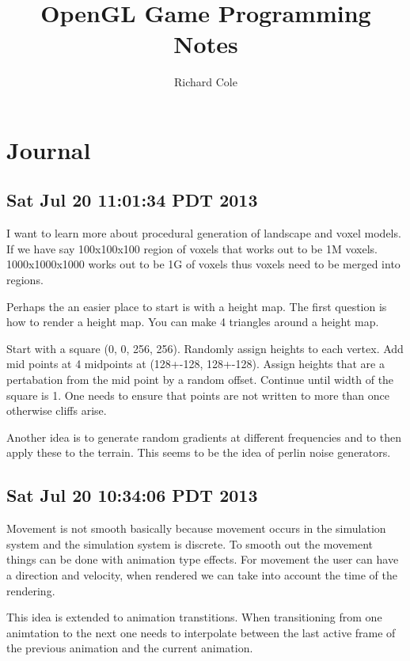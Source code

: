 \documentclass[12pt]{article}
\title{OpenGL Game Programming Notes}
\author{Richard Cole}
\date{}
\begin{document}
\maketitle

\section{Journal}

\subsection{Sat Jul 20 11:01:34 PDT 2013}

I want to learn more about procedural generation of landscape and
voxel models. If we have say 100x100x100 region of voxels that works
out to be 1M voxels. 1000x1000x1000 works out to be 1G of voxels thus
voxels need to be merged into regions.

Perhaps the an easier place to start is with a height map. The first
question is how to render a height map. You can make 4 triangles
around a height map.

Start with a square (0, 0, 256, 256). Randomly assign heights to each
vertex. Add mid points at 4 midpoints at (128+-128, 128+-128). Assign
heights that are a pertabation from the mid point by a random
offset. Continue until width of the square is 1. One needs to ensure
that points are not written to more than once otherwise cliffs arise.

Another idea is to generate random gradients at different frequencies
and to then apply these to the terrain. This seems to be the idea of
perlin noise generators.





\subsection{Sat Jul 20 10:34:06 PDT 2013}

Movement is not smooth basically because movement occurs in the
simulation system and the simulation system is discrete. To smooth out
the movement things can be done with animation type effects. For
movement the user can have a direction and velocity, when rendered we
can take into account the time of the rendering.

This idea is extended to animation transtitions. When transitioning
from one animtation to the next one needs to interpolate between the
last active frame of the previous animation and the current animation.
\end{document}
